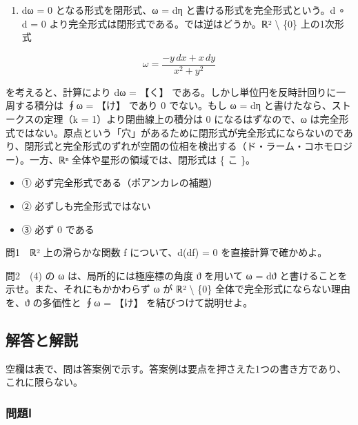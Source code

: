 \documentclass[
  10pt,
  a4paper,
]{article}
\providecommand{\tightlist}{%
  \setlength{\itemsep}{0pt}\setlength{\parskip}{0pt}}
\begin{document}
\begin{enumerate}
\def\labelenumi{(\arabic{enumi})}
\setcounter{enumi}{3}
\tightlist
\item
  dω = 0 となる形式を閉形式、ω = dη と書ける形式を完全形式という。d
  {\fallbackfont ∘} d = 0
  より完全形式は閉形式である。では逆はどうか。{\fallbackfont ℝ}²
  \textbackslash{} \{0\} 上の1次形式
\end{enumerate}

\[\omega = \frac{-y\,dx + x\,dy}{x^2 + y^2}\]

を考えると、計算により dω = 【く】
である。しかし単位円を反時計回りに一周する積分は ∮ω = 【け】 であり 0
でない。もし ω = dη と書けたなら、ストークスの定理（k =
1）より閉曲線上の積分は 0 になるはずなので、ω
は完全形式ではない。原点という「穴」があるために閉形式が完全形式にならないのであり、閉形式と完全形式のずれが空間の位相を検出する（ド・ラーム・コホモロジー）。一方、{\fallbackfont ℝⁿ}
全体や星形の領域では、閉形式は \{ こ \}。

\begin{itemize}
\tightlist
\item
  ① 必ず完全形式である（ポアンカレの補題）
\item
  ② 必ずしも完全形式ではない
\item
  ③ 必ず 0 である
\end{itemize}

問1　{\fallbackfont ℝ}² 上の滑らかな関数 f について、d(df) = 0
を直接計算で確かめよ。

問2　(4) の ω は、局所的には極座標の角度 {\fallbackfont ϑ} を用いて ω =
d{\fallbackfont ϑ} と書けることを示せ。また、それにもかかわらず ω が
{\fallbackfont ℝ}² \textbackslash{} \{0\}
全体で完全形式にならない理由を、{\fallbackfont ϑ} の多価性と ∮ω = 【け】
を結びつけて説明せよ。

\hypertarget{ux89e3ux7b54ux3068ux89e3ux8aac}{%
\subsection{解答と解説}\label{ux89e3ux7b54ux3068ux89e3ux8aac}}

空欄は表で、問は答案例で示す。答案例は要点を押さえた1つの書き方であり、これに限らない。

\hypertarget{ux554fux984cux2170}{%
\subsubsection{問題Ⅰ}\label{ux554fux984cux2170}}
\end{document}

